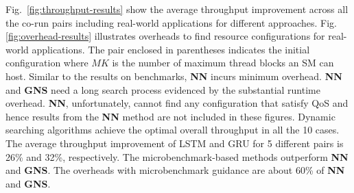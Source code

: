 Fig.~\ref{fig:throughput-results} %
show the average throughput improvement across all the co-run pairs including real-world applications for different approaches.
Fig. \ref{fig:overhead-results} %
illustrates overheads to
find resource configurations for real-world applications. The pair enclosed in parentheses indicates the initial configuration where $MK$ is the number of maximum thread blocks an SM can host. Similar to the results on benchmarks, \textbf{NN} incurs minimum overhead. \textbf{NN} and \textbf{GNS} %
need a long search process evidenced by the substantial runtime overhead.
\textbf{NN}, unfortunately, cannot find any configuration that satisfy QoS and hence results from the \textbf{NN} method are not included in these figures.
Dynamic searching algorithms %
achieve the optimal overall throughput in all the 10 cases. %
The average throughput improvement of LSTM and GRU for 5 different pairs is 26\% and 32\%, respectively. %
The microbenchmark-based methods outperform \textbf{NN} and \textbf{GNS}. %
The overheads with microbenchmark guidance are about 60\% of \textbf{NN} and \textbf{GNS}.%

